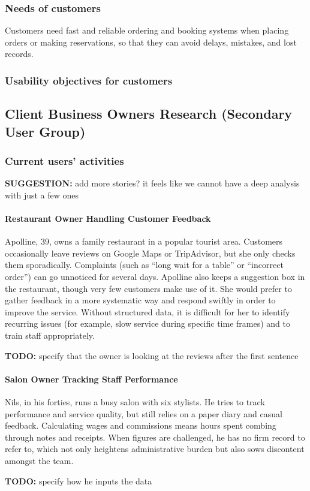 \documentclass[]{VUMIFTemplateClass}
\newcommand{\todocomment}[1]{%
    \begin{tcolorbox}[colback=red!20, colframe=red!60, arc=0pt, outer arc=0pt, boxrule=1pt, left=3pt, right=3pt, top=3pt, bottom=3pt]
        \textbf{\textcolor{orange!70!black}{TODO:}} #1
    \end{tcolorbox}
}
\newcommand{\suggestioncomment}[1]{%
    \definecolor{lime}{RGB}{50,205,50}%
    \begin{tcolorbox}[colback=lime!15, colframe=lime!60, arc=0pt, outer arc=0pt, boxrule=1pt, left=3pt, right=3pt, top=3pt, bottom=3pt]
        \textbf{\textcolor{lime!70!black}{SUGGESTION:}} #1
    \end{tcolorbox}%
}
\newcommand{\subsubsubsection}[1]{\paragraph{#1}}
\begin{document}
\subsubsection{Needs of customers}
Customers need fast and reliable ordering and booking systems when placing orders or making reservations, so that they can avoid delays, mistakes, and lost records.

\subsubsection{Usability objectives for customers}

\subsection{Client Business Owners Research (Secondary User Group)}

\subsubsection{Current users' activities}
\suggestioncomment{add more stories? it feels like we cannot have a deep analysis with just a few ones}

\subsubsubsection{Restaurant Owner Handling Customer Feedback}

Apolline, 39, owns a family restaurant in a popular tourist area. Customers
occasionally leave reviews on Google Maps or TripAdvisor, but she only checks
them sporadically. Complaints (such as “long wait for a table” or “incorrect
order”) can go unnoticed for several days. Apolline also keeps a suggestion box
in the restaurant, though very few customers make use of it. She would prefer to
gather feedback in a more systematic way and respond swiftly in order to improve
the service. Without structured data, it is difficult for her to identify
recurring issues (for example, slow service during specific time frames) and to
train staff appropriately.

\todocomment{specify that the owner is looking at the reviews after the first sentence}

\subsubsubsection{Salon Owner Tracking Staff Performance}

Nils, in his forties, runs a busy salon with six stylists. He tries to track
performance and service quality, but still relies on a paper diary and casual
feedback. Calculating wages and commissions means hours spent combing through
notes and receipts. When figures are challenged, he has no firm record to refer
to, which not only heightens administrative burden but also sows discontent
amongst the team.
\todocomment{specify how he inputs the data}
\end{document}
